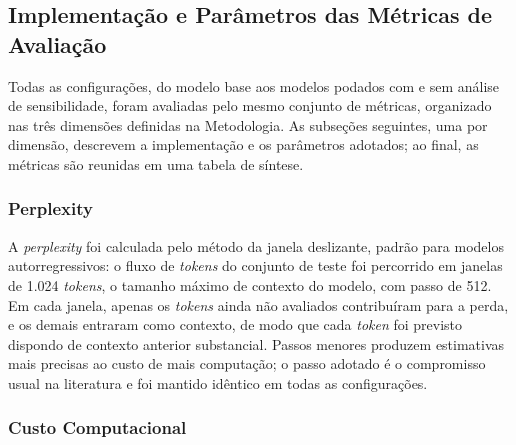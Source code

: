 \subsection{Implementação e Parâmetros das Métricas de Avaliação}\label{sec:metricas}

Todas as configurações, do modelo base aos modelos podados com e sem análise de
sensibilidade, foram avaliadas pelo mesmo conjunto de métricas, organizado nas três
dimensões definidas na Metodologia. As subseções seguintes, uma por
dimensão, descrevem a implementação e os parâmetros adotados; ao final, as métricas são
reunidas em uma tabela de síntese.

\subsubsection{Perplexity}\label{subsec:metrica_perplexity}

A \textit{perplexity} foi calculada pelo método da janela deslizante, padrão para modelos
autorregressivos: o fluxo de \textit{tokens} do conjunto de teste foi percorrido em janelas
de 1.024 \textit{tokens}, o tamanho máximo de contexto do modelo, com passo de 512. Em cada
janela, apenas os \textit{tokens} ainda não avaliados contribuíram para a perda, e os demais
entraram como contexto, de modo que cada \textit{token} foi previsto dispondo de contexto
anterior substancial. Passos menores produzem estimativas mais precisas ao custo de mais
computação; o passo adotado é o compromisso usual na literatura
\cite{HuggingFacePerplexity} e foi mantido idêntico em todas as configurações.

\subsubsection{Custo Computacional}\label{subsec:metrica_custo}

